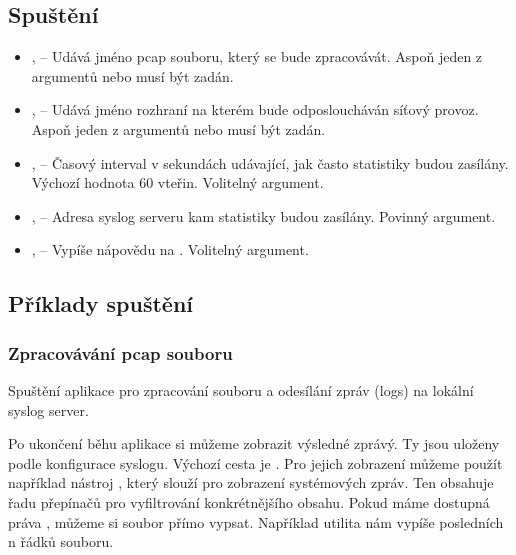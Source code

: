 \documentclass[11pt, a4paper, titlepage]{article}
\begin{document}
\subsection{Spuštění}


\begin{itemize}
	\item {},  -- Udává jméno pcap souboru, který se bude zpracovávát. Aspoň jeden z argumentů  nebo  musí být zadán.

	\item {},  -- Udává jméno rozhraní na kterém bude odposloucháván síťový provoz. Aspoň jeden z argumentů  nebo  musí být zadán.

	\item {},  -- Časový interval v sekundách udávající, jak často statistiky budou zasílány. Výchozí hodnota 60 vteřin. Volitelný argument.

	\item {},  -- Adresa syslog serveru kam statistiky budou zasílány. Povinný argument.

	\item {},  -- Vypíše nápovědu na . Volitelný argument.
\end{itemize}
\smallskip



\subsection{Příklady spuštění}

\subsubsection{Zpracovávání pcap souboru}

Spuštění aplikace pro zpracování  souboru a odesílání zpráv (logs) na lokální syslog server.

\begin{center}
\end{center}

Po ukončení běhu aplikace si můžeme zobrazit výsledné zprávý. Ty jsou uloženy podle konfigurace syslogu. Výchozí cesta je . Pro jejich zobrazení můžeme použít například nástroj , který slouží pro zobrazení systémových zpráv. Ten obsahuje řadu přepínačů pro vyfiltrování konkrétnějšího obsahu. Pokud máme dostupná práva , můžeme si soubor přímo vypsat. Například utilita  nám vypíše posledních n řádků souboru.
\end{document}
